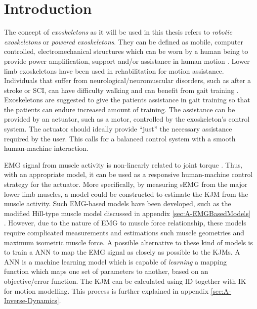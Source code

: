 \documentclass[../main.tex]{subfiles}
\begin{document}
\chapter{Introduction}
The concept of \textit{exoskeletons} as it will be used in this thesis refers to \textit{robotic exoskeletons} or \textit{powered exoskeletons}. 
They can be defined as mobile, computer controlled, electromechanical structures which can be worn by a human being to provide power amplification, support and/or assistance in human motion \cite{Anam2012, Gorgey2018}. 
Lower limb exoskeletons have been used in rehabilitation for motion assistance.
Individuals that suffer from neurological/neuromuscular disorders, such as after a stroke or \ac{SCI}, can have difficulty walking and can benefit from gait training \cite{Gorgey2018, Young2017, Lerner2017}.
Exoskeletons are suggested to give the patients assistance in gait training so that the patients can endure increased amount of training.
The assistance can be provided by an actuator, such as a motor, controlled by the exoskeleton's control system.
The actuator should ideally provide ``just'' the necessary assistance required by the user.
This calls for a balanced control system with a smooth human-machine interaction.

\Ac{EMG} signal from muscle activity is non-linearly related to joint torque \cite{Young2017}.
Thus, with an appropriate model, it can be used as a responsive human-machine control strategy for the actuator.
More specifically, by measuring \ac{sEMG} from the major lower limb muscles, a model could be constructed to estimate the \ac{KJM} from the muscle activity.
Such \ac{EMG}-based models have been developed, such as the modified Hill-type muscle model discussed in appendix \ref{sec:A-EMGBasedModels} \cite{Pizzolato2015, Erdemir2007, Lloyd2003}.
However, due to the nature of \ac{EMG} to muscle force relationship, these models require complicated measurements and estimations such muscle geometries and maximum isometric muscle force.
A possible alternative to these kind of models is to train a \ac{ANN} to map the \ac{EMG} signal as closely as possible to the \acp{KJM}.
A \ac{ANN} is a machine learning model which is capable of \textit{learning} a mapping function which maps one set of parameters to another, based on an objective/error function. 
The \ac{KJM} can be calculated using \ac{ID} together with \ac{IK} for motion modelling. 
This process is further explained in appendix \ref{sec:A-Inverse-Dynamics}.
\end{document}

